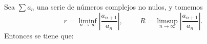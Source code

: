\begin{theorem}
  Sea $\sum a_n$ una serie de números complejos no nulos, y tomemos
  \begin{equation*}
    r=\liminf_{n\to\infty}\left|\frac{a_{n+1}}{a_n}\right|, \hspace{1cm}R=\limsup_{n\to\infty}\left|\frac{a_{n+1}}{a_n}\right|.
  \end{equation*}
  Entonces se tiene que:
\end{theorem}

